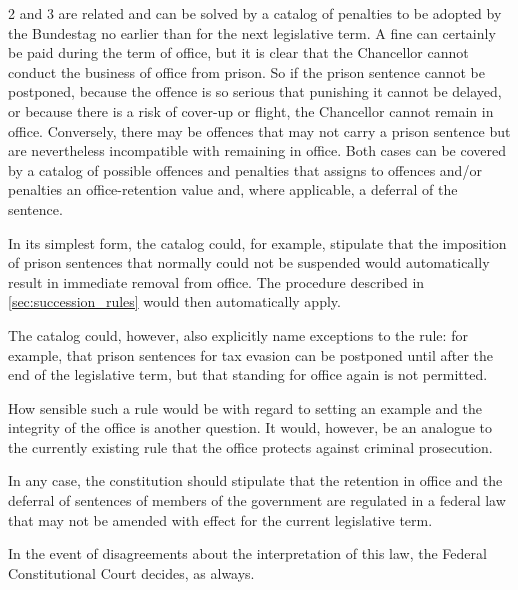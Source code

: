 2 and 3 are related and can be solved by a catalog of penalties to be adopted by the Bundestag no earlier than for the next legislative term.
A fine can certainly be paid during the term of office, but it is clear that the Chancellor cannot conduct the business of office from prison.
So if the prison sentence cannot be postponed, because the offence is so serious that punishing it cannot be delayed, or because there is a risk of cover-up or flight, the Chancellor cannot remain in office.
Conversely, there may be offences that may not carry a prison sentence but are nevertheless incompatible with remaining in office.
Both cases can be covered by a catalog of possible offences and penalties that assigns to offences and/or penalties an office-retention value and, where applicable, a deferral of the sentence.

In its simplest form, the catalog could, for example, stipulate that the imposition of prison sentences that normally could not be suspended would automatically result in immediate removal from office.
The procedure described in \cref{sec:succession_rules} would then automatically apply.

The catalog could, however, also explicitly name exceptions to the rule: for example, that prison sentences for tax evasion can be postponed until after the end of the legislative term, but that standing for office again is not permitted.

How sensible such a rule would be with regard to setting an example and the integrity of the office is another question.
It would, however, be an analogue to the currently existing rule that the office protects against criminal prosecution.

In any case, the constitution should stipulate that the retention in office and the deferral of sentences of members of the government are regulated in a federal law that may not be amended with effect for the current legislative term.

In the event of disagreements about the interpretation of this law, the Federal Constitutional Court decides, as always.

